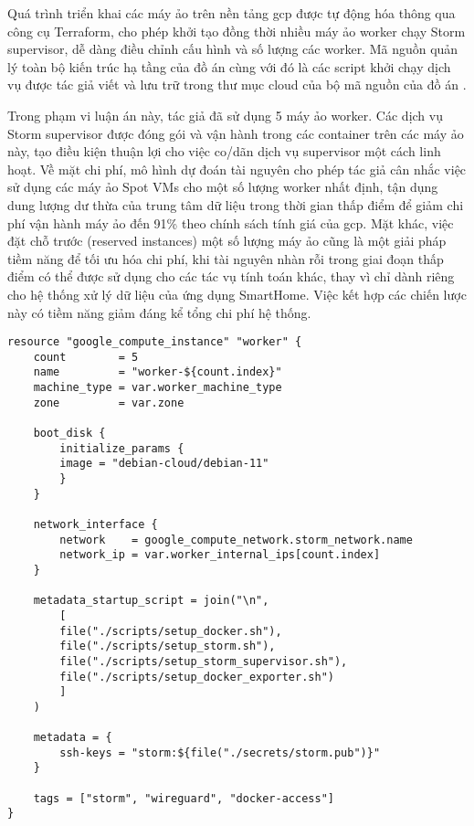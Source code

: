 Quá trình triển khai các máy ảo trên nền tảng \gls{gcp} được tự động hóa thông qua công cụ Terraform, cho phép khởi tạo đồng thời nhiều máy ảo worker chạy Storm supervisor, dễ dàng điều chỉnh cấu hình và số lượng các worker. Mã nguồn quản lý toàn bộ kiến trúc hạ tầng của đồ án cùng với đó là các script khởi chạy dịch vụ được tác giả viết và lưu trữ trong thư mục cloud của bộ mã nguồn của đồ án \autocite{lemionday_thesis_storm}.

Trong phạm vi luận án này, tác giả đã sử dụng 5 máy ảo worker. Các dịch vụ Storm supervisor được đóng gói và vận hành trong các container trên các máy ảo này, tạo điều kiện thuận lợi cho việc co/dãn dịch vụ supervisor một cách linh hoạt. Về mặt chi phí, mô hình dự đoán tài nguyên cho phép tác giả cân nhắc việc sử dụng các máy ảo Spot VMs cho một số lượng worker nhất định, tận dụng dung lượng dư thừa của trung tâm dữ liệu trong thời gian thấp điểm để giảm chi phí vận hành máy ảo đến 91\% theo chính sách tính giá của \acrshort{gcp}. Mặt khác, việc đặt chỗ trước (reserved instances) một số lượng máy ảo cũng là một giải pháp tiềm năng để tối ưu hóa chi phí, khi tài nguyên nhàn rỗi trong giai đoạn thấp điểm có thể được sử dụng cho các tác vụ tính toán khác, thay vì chỉ dành riêng cho hệ thống xử lý dữ liệu của ứng dụng SmartHome. Việc kết hợp các chiến lược này có tiềm năng giảm đáng kể tổng chi phí hệ thống.

\newpage

\begin{lstlisting}[language=HCL, caption={Cấu hình khởi tạo máy ảo worker chạy Storm supervisor}]
resource "google_compute_instance" "worker" {
    count        = 5
    name         = "worker-${count.index}"
    machine_type = var.worker_machine_type
    zone         = var.zone

    boot_disk {
        initialize_params {
        image = "debian-cloud/debian-11"
        }
    }

    network_interface {
        network    = google_compute_network.storm_network.name
        network_ip = var.worker_internal_ips[count.index]
    }

    metadata_startup_script = join("\n",
        [
        file("./scripts/setup_docker.sh"),
        file("./scripts/setup_storm.sh"),
        file("./scripts/setup_storm_supervisor.sh"),
        file("./scripts/setup_docker_exporter.sh")
        ]
    )

    metadata = {
        ssh-keys = "storm:${file("./secrets/storm.pub")}"
    }

    tags = ["storm", "wireguard", "docker-access"]
}
\end{lstlisting}

